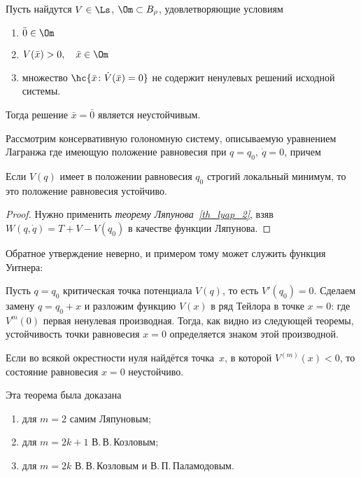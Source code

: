 \documentclass[a4paper,12pt]{article}
\newcommand{\tdf}[1]{\textsl{#1}}
\newcommand{\spr}[2]{\hr{#1 \cdot #2}}
\begin{document}
\begin{theorem}
  Пусть найдутся $V\in\Ls$, $\Om\subset B_\rho$, удовлетворяющие условиям
  \begin{enumerate}
  \item $\bar 0 \in \Om$
  \item $V(\bar x) > 0, \quad \bar x\in\Om$
  \item множество $\hc{\bar x\colon \dot V(\bar x ) = 0} $ не содержит ненулевых решений исходной системы.
  \end{enumerate}
  Тогда решение $\bar x = \bar 0$ является неустойчивым.
\end{theorem}

{}

Рассмотрим консервативную голономную систему, описываемую уравнением Лагранжа
 где
\equ{T=\frac12\spr{A(q)\dot{q}}{\dot{q}},} имеющую положение равновесия при $q=q_0,\ \dot{q}=0$,
причем 
\begin{theorem}
Если $V(q)$ имеет в положении равновесия $q_0$ строгий локальный минимум, то это положение
равновесия устойчиво.
\end{theorem}
\begin{proof}
Нужно применить \tdf{теорему Ляпунова~\ref{th_lyap_2}}, взяв $W(q,\dot{q})=T+V-V(q_0)$ в качестве функции Ляпунова.
\end{proof}
\begin{note}
Обратное утверждение неверно, и примером тому может служить функция Уитнера:
\end{note}
Пусть $q=q_0$ критическая точка потенциала $V(q)$,
то есть ${V'(q_0)=0}$. Сделаем замену $q=q_0+x$ и разложим
функцию $V(x)$ в ряд Тейлора в точке $x=0$:
 где $V^{m}(0)$
первая ненулевая производная. Тогда, как видно из следующей теоремы,
устойчивость точки равновесия $x=0$ определяется знаком этой
производной.
\begin{theorem}
\label{th_lyap_3}
Если во всякой окрестности нуля найдётся точка~$x$, в которой $V^{(m)}(x)<0$,
то состояние равновесия $x=0$ неустойчиво.
\end{theorem}
\begin{note}
Эта теорема была доказана
\begin{enumerate}
  \item для $m=2$ самим Ляпуновым;
  \item для $m=2k+1$ В.\,В.\,Козловым;
  \item для $m=2k$ В.\,В.\,Козловым и В.\,П.\,Паламодовым.
\end{enumerate}
\end{note}
\end{document}
